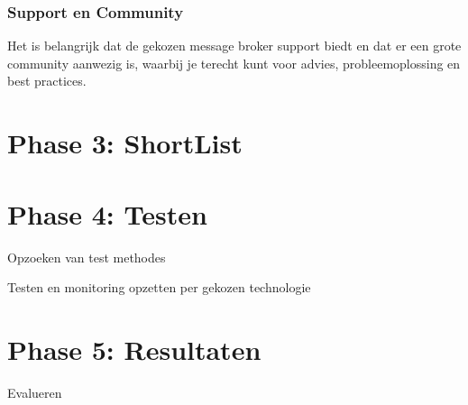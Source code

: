 \subsubsection{Support en Community}
Het is belangrijk dat de gekozen message broker support biedt en dat er een grote community aanwezig is, 
waarbij je terecht kunt voor advies, probleemoplossing en best practices.

\section{Phase 3: ShortList}

\section{Phase 4: Testen}
Opzoeken van test methodes 

Testen en monitoring opzetten per gekozen technologie

\section{Phase 5: Resultaten}

Evalueren
